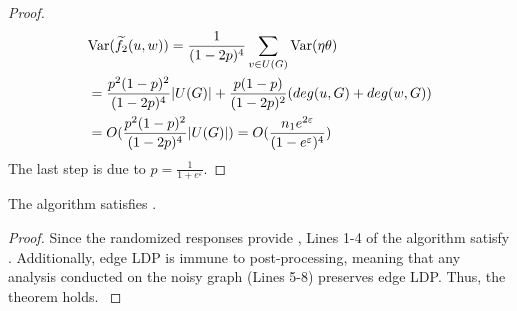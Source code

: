 \begin{proof}
\begin{align*}
& \mathrm{Var}( \widetilde{f}_2(u,w))  = \frac{1}{(1-2p)^4} \sum_{v\in U(G)}  \mathrm{Var}( \eta \theta ) \\
&= {\color{black}\frac{p^2(1-p)^2}{(1-2p)^4} |U(G)|
    + \frac{p(1-p)}{(1-2p)^2}(deg(u, G) + deg(w, G)) } \\
&= {\color{black} O( \frac{p^2(1-p)^2}{(1-2p)^4}  |U(G)|  ) = O(\frac{ n_1 e^{2 \varepsilon}}{(1 - e^{\varepsilon})^4} ) } 
\end{align*}
The last step is due to $p = \frac{1}{1 + e^{\varepsilon}}$. 
\end{proof}


\begin{theorem}
{\color{black}
The \bs algorithm satisfies \epldp. 
}
\end{theorem}
\begin{proof}
{\color{black}
Since the randomized responses provide \epldp\cite{imola2021locally, imola2022differentially}, Lines 1-4 of the algorithm satisfy \epldp. 
Additionally, edge LDP is immune to post-processing, meaning that any analysis conducted on the noisy graph (Lines 5-8) preserves edge LDP. Thus, the theorem holds.
}
\end{proof}